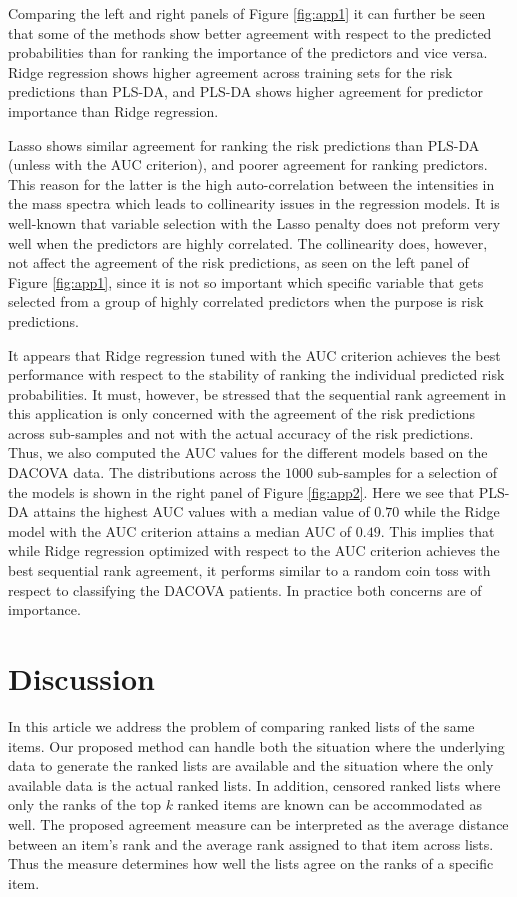 \documentclass[12pt,a4paper]{article}
\theoremstyle{plain}
\begin{document}
Comparing the left and right panels of Figure \ref{fig:app1} it can
further be seen that some of the methods show better agreement with
respect to the predicted probabilities than for ranking the importance
of the predictors and vice versa. Ridge regression shows higher agreement across training
sets for the risk predictions than PLS-DA, and PLS-DA shows higher
agreement for predictor importance than Ridge regression.

Lasso shows similar agreement for ranking the risk predictions than
PLS-DA (unless with the AUC criterion), and poorer agreement for ranking
predictors. This reason for the latter is the high auto-correlation
between the intensities in the mass spectra which leads to
collinearity issues in the regression models. It is well-known that
variable selection with the Lasso penalty does not preform very well
when the predictors are highly correlated. The collinearity does,
however, not affect the agreement of the risk predictions, as seen on
the left panel of Figure \ref{fig:app1}, since it is not so important
which specific variable that gets selected from a group of highly correlated
predictors when the purpose is risk predictions.

It appears that Ridge regression tuned with the AUC criterion achieves
the best performance with respect to the stability of ranking the
individual predicted risk probabilities. It must, however, be stressed
that the sequential rank agreement in this application is only
concerned with the agreement of the risk predictions across
sub-samples and not with the actual accuracy of the risk
predictions. Thus, we also computed the AUC values for the different models
based on the DACOVA data. The distributions across the $1000$
sub-samples for a selection of the models is shown in the right panel
of Figure \ref{fig:app2}.  Here we see that PLS-DA attains the highest
AUC values with a median value of $0.70$ while the Ridge model with
the AUC criterion attains a median AUC of $0.49$. This implies that
while Ridge regression optimized with respect to the AUC criterion
achieves the best sequential rank agreement, it performs similar to a
random coin toss with respect to classifying the DACOVA patients.
In practice both concerns are of importance.



\section{Discussion}
In this article we address the problem of comparing ranked lists of
the same items. Our proposed method can handle both the situation
where the underlying data to generate the ranked lists are available
and the situation where the only available data is the actual ranked
lists. In addition, censored ranked lists where only the ranks of the
top $k$ ranked items are known can be accommodated as well. The
proposed agreement measure can be interpreted as the average distance
between an item's rank and the average rank assigned to that item
across lists. Thus the measure determines how well the lists agree on
the ranks of a specific item.
\end{document}
